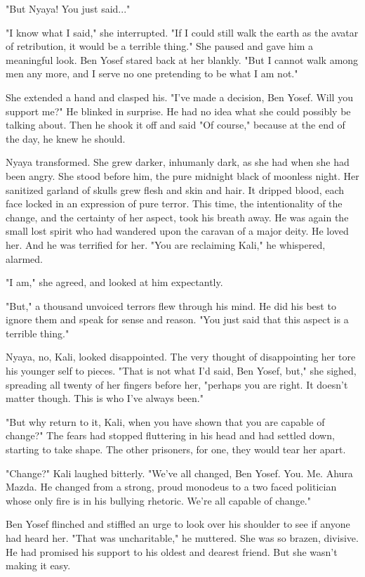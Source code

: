 \documentclass{amsart}
\begin{document}
"But Nyaya! You just said..."

"I know what I said," she interrupted. "If I could still walk the earth as the avatar of retribution, it would be a terrible thing." She paused and gave him a meaningful look. Ben Yosef stared back at her blankly. "But I cannot walk among men any more, and I serve no one pretending to be what I am not."

She extended a hand and clasped his. "I've made a decision, Ben Yosef. Will you support me?" He blinked in surprise. He had no idea what she could possibly be talking about. Then he shook it off and said "Of course," because at the end of the day, he knew he should.

Nyaya transformed. She grew darker, inhumanly dark, as she had when she had been angry. She stood before him, the pure midnight black of moonless night. Her sanitized garland of skulls grew flesh and skin and hair. It dripped blood, each face locked in an expression of pure terror. This time, the intentionality of the change, and the certainty of her aspect, took his breath away. He was again the small lost spirit who had wandered upon the caravan of a major deity. He loved her. And he was terrified for her.  "You are reclaiming Kali," he whispered, alarmed.

"I am," she agreed, and looked at him expectantly. 

"But," a thousand unvoiced terrors flew through his mind. He did his best to ignore them and speak for sense and reason. "You just said that this aspect is a terrible thing."

Nyaya, no, Kali, looked disappointed. The very thought of disappointing her tore his younger self to pieces. "That is not what I'd said, Ben Yosef, but," she sighed, spreading all twenty of her fingers before her, "perhaps you are right. It doesn't matter though. This is who I've always been." 

"But why return to it, Kali, when you have shown that you are capable of change?" The fears had stopped fluttering in his head and had settled down, starting to take shape. The other prisoners, for one, they would tear her apart.

"Change?" Kali laughed bitterly. "We've all changed, Ben Yosef. You. Me. Ahura Mazda. He changed from a strong, proud monodeus to a two faced politician whose only fire is in his bullying rhetoric. We're all capable of change."

Ben Yosef flinched and stiffled an urge to look over his shoulder to see if anyone had heard her. "That was uncharitable," he muttered. She was so brazen, divisive. He had promised his support to his oldest and dearest friend. But she wasn't making it easy. 
\end{document}
